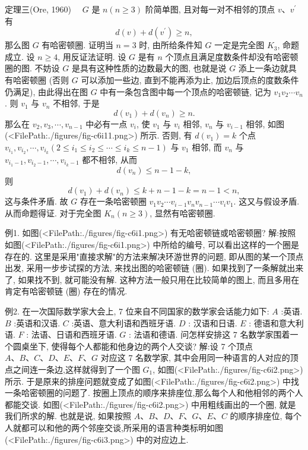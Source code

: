 定理三(Ore, 1960) $\quad G$ 是 $n(n \geqslant 3)$ 阶简单图, 且对每一对不相邻的顶点 $v 、 v^{\prime}$ 有
$$
d(v)+d\left(v^{\prime}\right) \geqslant n,
$$
那么图 $G$ 有哈密顿圈.
证明当 $n=3$ 时, 由所给条件知 $G$ 一定是完全图 $K_3$, 命题成立.
设 $n \geqslant 4$, 用反证法证明.
设 $G$ 是有 $n$ 个顶点且满足度数条件却没有哈密顿圈的图.
不妨设 $G$ 是具有这种性质的边数最大的图, 也就是说 $G$ 添上一条边就具有哈密顿圈 (否则 $G$ 可以添加一些边, 直到不能再添为止, 加边后顶点的度数条件仍满足), 由此得出在图 $G$ 中有一条包含图中每一个顶点的哈密顿链, 记为 $v_1 v_2 \cdots v_n$. 则 $v_1$ 与 $v_n$ 不相邻, 于是
$$
d\left(v_1\right)+d\left(v_n\right) \geqslant n .
$$
那么在 $v_2, v_3, \cdots, v_{n-1}$ 中必有一点 $v_i$, 使 $v_1$ 与 $v_i$ 相邻, $v_n$ 与 $v_{i-1}$ 相邻, 如图(<FilePath:./figures/fig-c6i11.png>) 所示.
否则, 有 $d\left(v_1\right)=k$ 个点 $v_{i_1}, v_{i_2}, \cdots, v_{i_k} \left(2 \leqslant i_1 \leqslant i_2 \leqslant \cdots \leqslant i_k \leqslant n-1\right)$ 与 $v_1$ 相邻, 而 $v_n$ 与 $v_{i_1-1}, v_{i_2-1}, \cdots,v_{i_k-1}$ 都不相邻, 从而
$$
d\left(v_n\right) \leqslant n-1-k,
$$
则
$$
d\left(v_1\right)+d\left(v_n\right) \leqslant k+n-1-k=n-1<n,
$$
这与条件矛盾.
故 $G$ 存在一条哈密顿圈 $v_1 v_2 \cdots v_{i-1} v_n v_{n-1} \cdots v_i v_1$. 这又与假设矛盾.
从而命题得证.
对于完全图 $K_n(n \geqslant 3)$, 显然有哈密顿圈.



例1. 如图(<FilePath:./figures/fig-c6i1.png>) 有无哈密顿链或哈密顿圈?
解:按照如图(<FilePath:./figures/fig-c6i1.png>) 中所给的编号, 可以看出这样的一个圈是存在的.
这里是采用"直接求解"的方法来解决环游世界的问题, 即从图的某一个顶点出发, 采用一步步试探的方法, 来找出图的哈密顿链 (圈). 如果找到了一条解就出来了, 如果找不到, 就可能没有解.
这种方法一般只用在比较简单的图上, 而且多用在肯定有哈密顿链 (圈) 存在的情况.



例2. 在一次国际数学家大会上, 7 位来自不同国家的数学家会话能力如下:
$A$ :英语.
$B$ :英语和汉语.
$C$ :英语、意大利语和西班牙语.
$D$ : 汉语和日语.
$E$ : 德语和意大利语.
$F$ : 法语、日语和西班牙语.
$G$ : 法语和德语.
问怎样安排这 7 名数学家围着一个圆桌坐下, 使得每个人都能和他身边的两个人交谈?
解:设 7 个顶点 $A 、 B 、 C 、 D 、 E 、 F 、 G$ 对应这 7 名数学家, 其中会用同一种语言的人对应的顶点之间连一条边,这样就得到了一个图 $G_1$, 如图(<FilePath:./figures/fig-c6i2.png>) 所示.
于是原来的排座问题就变成了如图(<FilePath:./figures/fig-c6i2.png>) 中找一条哈密顿圈的问题了.
按圈上顶点的顺序来排座位,那么每个人和他相邻的两个人都能交谈.
如图(<FilePath:./figures/fig-c6i2.png>) 中用粗线画出的一个圈, 就是我们所求的解.
也就是说, 如果按照 $A 、 B 、 D 、 F 、 G 、 E 、 C$ 的顺序排座位, 每个人就都可以和他的两个邻座交谈,所采用的语言种类标明如图(<FilePath:./figures/fig-c6i3.png>) 中的对应边上.



